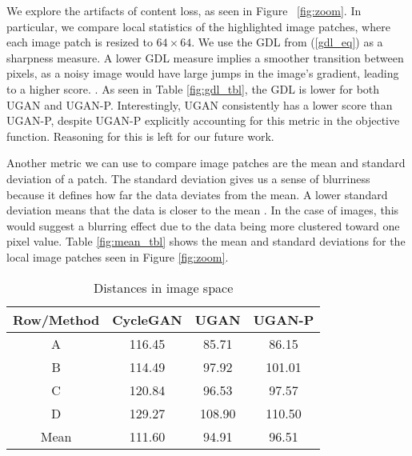 We explore the artifacts of content loss, as seen in Figure ~\ref{fig:zoom}. In particular, we compare local statistics
of the highlighted image patches, where each image patch is resized to $64 \times 64$. We use the GDL
\cite{mathieu2015deep} from (\ref{gdl_eq}) as a sharpness measure. A lower GDL measure implies a smoother transition
between pixels, as a noisy image would have large jumps in the image's gradient, leading to a higher score. .
As seen in Table \ref{fig:gdl_tbl}, the GDL is lower for both UGAN and UGAN-P. Interestingly, UGAN consistently has a
lower score than UGAN-P, despite UGAN-P explicitly accounting for this metric in the objective function. Reasoning for
this is left for our future work.

Another metric we can use to compare image patches are the mean and standard deviation of a patch. The standard
deviation gives us a sense of blurriness because it defines how far the data deviates from the mean. A lower standard
deviation means that the data is closer to the mean . In the case of images, this would suggest a blurring effect due to the data being
more clustered toward one pixel value. Table \ref{fig:mean_tbl} shows the mean and standard deviations for the local
image patches seen in Figure \ref{fig:zoom}. 

\begin{table}
\centering
\caption{Distances in image space}
\begin{tabular}{| c | c | c | c |}
   \hline
   Row/Method & CycleGAN & \textbf{UGAN} & \textbf{UGAN-P} \\ \hline
   A          & 116.45 & 85.71  & 86.15  \\ \hline
   B          & 114.49 & 97.92  & 101.01 \\ \hline
   C          & 120.84 & 96.53  & 97.57  \\ \hline
   D          & 129.27 & 108.90 & 110.50 \\ \hline
   Mean       & 111.60 & 94.91  & 96.51 \\ \hline
\end{tabular}
\end{table}


